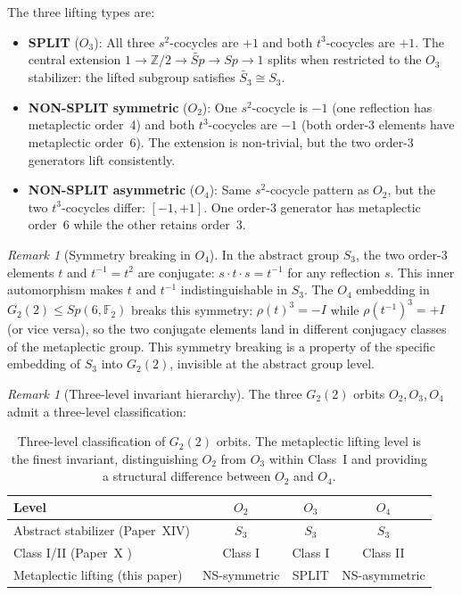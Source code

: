 \documentclass[11pt,a4paper]{article}
\theoremstyle{remark}
\newtheorem{remark}[theorem]{Remark}
\newcommand{\wtSp}{\widetilde{Sp}}
\begin{document}
\noindent
The three lifting types are:
\begin{itemize}
  \item \textbf{SPLIT} ($O_3$): All three $s^2$-cocycles are $+1$ and both
        $t^3$-cocycles are $+1$.
        The central extension $1 \to \mathbb{Z}/2 \to \wtSp \to Sp \to 1$
        splits when restricted to the $O_3$ stabilizer: the lifted subgroup
        satisfies $\widetilde{S_3} \cong S_3$.

  \item \textbf{NON-SPLIT symmetric} ($O_2$): One $s^2$-cocycle is $-1$
        (one reflection has metaplectic order~4) and both $t^3$-cocycles
        are $-1$ (both order-3 elements have metaplectic order~6).
        The extension is non-trivial, but the two order-3 generators lift
        consistently.

  \item \textbf{NON-SPLIT asymmetric} ($O_4$): Same $s^2$-cocycle pattern
        as $O_2$, but the two $t^3$-cocycles differ: $[-1, +1]$.
        One order-3 generator has metaplectic order~6 while the other retains
        order~3.
\end{itemize}

\begin{remark}[Symmetry breaking in $O_4$]
In the abstract group $S_3$, the two order-3 elements $t$ and $t^{-1} = t^2$
are conjugate: $s \cdot t \cdot s = t^{-1}$ for any reflection $s$.
This inner automorphism makes $t$ and $t^{-1}$ indistinguishable in $S_3$.
The $O_4$ embedding in $G_2(2) \leq Sp(6,\mathbb{F}_2)$ breaks this symmetry:
$\rho(t)^3 = -I$ while $\rho(t^{-1})^3 = +I$ (or vice versa), so the two
conjugate elements land in different conjugacy classes of the metaplectic group.
This symmetry breaking is a property of the specific embedding of $S_3$ into
$G_2(2)$, invisible at the abstract group level.
\end{remark}

\begin{remark}[Three-level invariant hierarchy]
\label{rem:3level}
The three $G_2(2)$ orbits $O_2, O_3, O_4$ admit a three-level classification:
\end{remark}

\begin{table}[H]
\centering
\caption{Three-level classification of $G_2(2)$ orbits.
The metaplectic lifting level is the finest invariant, distinguishing
$O_2$ from $O_3$ within Class~I and providing a structural difference
between $O_2$ and $O_4$.}
\label{tab:3level}
\begin{tabular}{lccc}
\toprule
Level & $O_2$ & $O_3$ & $O_4$ \\
\midrule
Abstract stabilizer (Paper~XIV) & $S_3$ & $S_3$ & $S_3$ \\
Class I/II (Paper~X \cite{PaperX}) & Class I & Class I & Class II \\
Metaplectic lifting (this paper) & NS-symmetric & SPLIT & NS-asymmetric \\
\bottomrule
\end{tabular}
\end{table}
\end{document}
